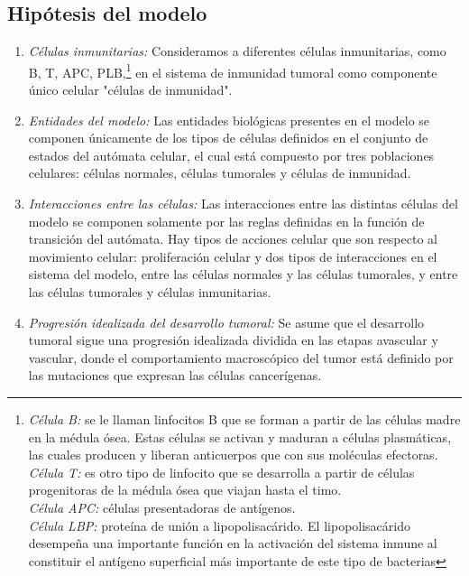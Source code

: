\documentclass[12pt]{amsart}
\begin{document}
\subsection{Hip\'otesis del modelo}
\begin{enumerate}

\item {{\it C\'elulas inmunitarias: }} Consideramos a diferentes c\'elulas inmunitarias, como B, T, APC, PLB,\footnote{{\it C\'elula B:} se le llaman linfocitos B que se forman a partir de las c\'elulas madre en la m\'edula \'osea. Estas c\'elulas se activan y maduran a c\'elulas plasm\'aticas, las cuales producen y liberan anticuerpos que con sus mol\'eculas efectoras.\\ {\it C\'elula T:} es otro tipo de linfocito que se desarrolla a partir de c\'elulas progenitoras de la m\'edula \'osea que viajan hasta el timo.\\ {\it C\'elula APC:} c\'elulas presentadoras de ant\'igenos.\\ {\it C\'elula LBP:} prote\'ina de uni\'on a lipopolisac\'arido. El lipopolisac\'arido desempe\~na una importante funci\'on en la activaci\'on del sistema inmune al constituir el ant\'igeno superficial m\'as importante de este tipo de bacterias} en el sistema de inmunidad tumoral como componente \'unico celular "c\'elulas de inmunidad".
\item {\it Entidades del modelo:} Las entidades biol\'ogicas presentes en el modelo se componen \'unicamente de los tipos de c\'elulas definidos en el conjunto de estados del aut\'omata celular, el cual est\'a compuesto por tres poblaciones celulares: c\'elulas normales, c\'elulas tumorales y c\'elulas de inmunidad.
\item {\it Interacciones entre las c\'elulas:} Las interacciones entre las distintas c\'elulas del modelo se componen solamente por las reglas definidas en la funci\'on de transici\'on del aut\'omata. Hay tipos de acciones celular que son respecto al movimiento celular: proliferaci\'on celular y dos tipos de interacciones en el sistema del modelo, entre las c\'elulas normales y las c\'elulas tumorales, y entre las c\'elulas tumorales y c\'elulas inmunitarias.

\item {\it Progresi\'on idealizada del desarrollo tumoral:} Se asume que el desarrollo tumoral sigue una progresi\'on idealizada dividida en las etapas avascular y vascular, donde el comportamiento macrosc\'opico del tumor est\'a definido por las mutaciones que expresan las c\'elulas cancer\'igenas.


\end{enumerate}
\end{document}
